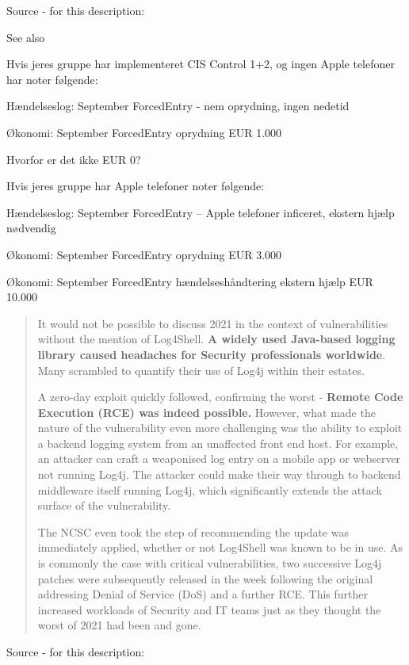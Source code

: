 \documentclass[Screen16to9,17pt]{foils}
\begin{document}
Source - for this description:\\

See also


Hvis jeres gruppe har implementeret CIS Control 1+2, og ingen Apple telefoner har noter følgende:
\begin{list2}
\item Hændelseslog: September ForcedEntry - nem oprydning, ingen nedetid
\item Økonomi: September ForcedEntry oprydning EUR 1.000
\end{list2}

Hvorfor er det ikke EUR 0?

Hvis jeres gruppe har Apple telefoner noter følgende:
\begin{list2}
\item Hændelseslog: September ForcedEntry -- Apple telefoner inficeret, ekstern hjælp nødvendig
\item Økonomi: September ForcedEntry oprydning EUR 3.000
\item Økonomi: September ForcedEntry hændelseshåndtering ekstern hjælp EUR 10.000
\end{list2}





\begin{quote}\small
It would not be possible to discuss 2021 in the context of vulnerabilities without the mention of Log4Shell. {\bf A widely used Java-based logging library caused headaches for Security professionals worldwide}. Many scrambled to quantify their use of Log4j within their estates.

A zero-day exploit quickly followed, confirming the worst - {\bf Remote Code Execution (RCE) was indeed possible.} However, what made the nature of the vulnerability even more challenging was the ability to exploit a backend logging system from an unaffected front end host. For example, an attacker can craft a weaponised log entry on a mobile app or webserver not running Log4j. The attacker could make their way through to backend middleware itself running Log4j, which significantly extends the attack surface of the vulnerability.

The NCSC even took the step of recommending the update was immediately applied, whether or not Log4Shell was known to be in use. As is commonly the case with critical vulnerabilities, two successive Log4j patches were subsequently released in the week following the original addressing Denial of Service (DoS) and a further RCE. This further increased workloads of Security and IT teams just as they thought the worst of 2021 had been and gone.
\end{quote}
Source - for this description:\\
\end{document}
